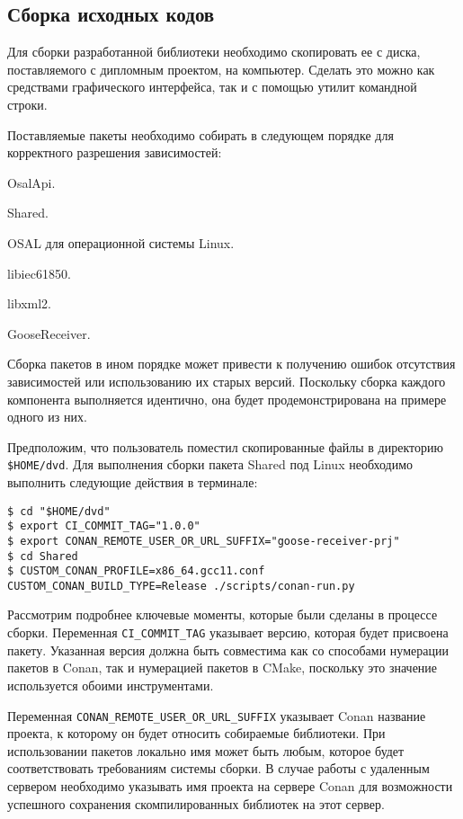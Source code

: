 \subsection{Сборка исходных кодов}

Для сборки разработанной библиотеки необходимо скопировать ее с диска, поставляемого
с дипломным проектом, на компьютер. Сделать это можно как средствами
графического интерфейса, так и с помощью утилит командной строки.

Поставляемые пакеты необходимо собирать в следующем порядке для корректного
разрешения зависимостей:
\begin{enumerate_num}
    \item OsalApi.
    \item Shared.
    \item OSAL для операционной системы Linux.
    \item libiec61850.
    \item libxml2.
    \item GooseReceiver.
\end{enumerate_num}

Сборка пакетов в ином порядке может привести к получению ошибок
отсутствия зависимостей или использованию их старых версий.
Поскольку сборка каждого компонента выполняется идентично, она будет
продемонстрирована на примере одного из них.

Предположим, что пользователь поместил скопированные файлы в директорию
\lstinline{$HOME/dvd}. Для выполнения сборки пакета Shared
под Linux необходимо выполнить следующие действия в терминале:

\begin{lstlisting}
$ cd "$HOME/dvd"
$ export CI_COMMIT_TAG="1.0.0"
$ export CONAN_REMOTE_USER_OR_URL_SUFFIX="goose-receiver-prj"
$ cd Shared
$ CUSTOM_CONAN_PROFILE=x86_64.gcc11.conf CUSTOM_CONAN_BUILD_TYPE=Release ./scripts/conan-run.py
\end{lstlisting}

Рассмотрим подробнее ключевые моменты, которые были сделаны в процессе сборки.
Переменная \lstinline{CI_COMMIT_TAG} указывает версию, которая будет присвоена
пакету. Указанная версия должна быть совместима как со способами нумерации
пакетов в Conan, так и нумерацией пакетов в CMake, поскольку это значение
используется обоими инструментами.

Переменная \lstinline{CONAN_REMOTE_USER_OR_URL_SUFFIX} указывает
Conan название проекта, к которому он будет относить собираемые библиотеки.
При использовании пакетов локально имя может быть любым, которое будет
соответствовать требованиям системы сборки. В случае работы с удаленным
сервером необходимо указывать имя проекта на сервере Conan для
возможности успешного сохранения скомпилированных библиотек на этот сервер.


